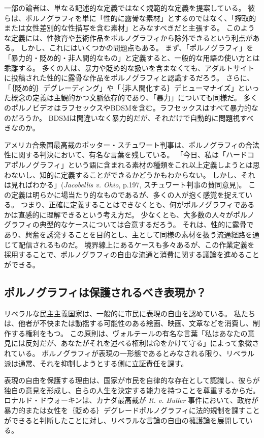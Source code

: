 \documentclass[paper=a4,book,openany]{jlreq}
\newcommand{\ig}[1]{}           %
\begin{document}
一部の論者は、単なる記述的な定義ではなく規範的な定義を提案している。
彼らは、ポルノグラフィを単に「性的に露骨な素材」とするのではなく、「搾取的または女性差別的な性描写を含む素材」とみなすべきだと主張する。
このような定義には、性教育や芸術作品をポルノグラフィから除外できるという利点がある。
しかし、これにはいくつかの問題点もある。
まず、「ポルノグラフィ」を「暴力的・貶め的・非人間的なもの」と定義すると、一般的な用語の使い方とは乖離する。
多くの人は、暴力や貶め的な扱いを含まなくても、アダルトサイトに投稿された性的に露骨な作品をポルノグラフィと認識するだろう。
さらに、「｛貶め的｝{デグレーディング}」や「｛非人間化する｝{デヒューマナイズ}」といった概念の定義は主観的かつ文脈依存的であり、「暴力」についても同様だ。
多くのポルノビデオはラフセックスやBDSMを含む。ラフセックスはすべて暴力的なのだろうか。
BDSMは間違いなく暴力的だが、それだけで自動的に問題視すべきなのか。

アメリカ合衆国最高裁のポッター・スチュワート判事は、ポルノグラフィの合法性に関する判決において、有名な言葉を残している。
「今日、私は「ハードコアポルノグラフィ」という語に含まれる素材の種類をこれ以上定義しようとは思わないし、知的に定義することができるかどうかもわからない。
しかし、それは見ればわかる」(\emph{Jacobellis v. Ohio}, p.197, スチュワート判事の賛同意見)。
この定義は明らかに場当たり的なものであるが、多くの人が抱く感覚を捉えている。
つまり、正確に定義することはできなくとも、何がポルノグラフィであるかは直感的に理解できるという考え方だ。
少なくとも、大多数の人々がポルノグラフィの典型的なケースについては合意するだろう。
それは、性的に露骨であり、興奮を誘発することを目的とし、主として同様の素材を扱う流通経路を通じて配信されるものだ。
境界線上にあるケースも多々あるが、この作業定義を採用することで、ポルノグラフィの自由な流通と消費に関する議論を進めることができる。

\subsection{ポルノグラフィは保護されるべき表現か？}

リベラルな民主主義国家は、一般的に市民に表現の自由を認めている。
私たちは、他者が不快または動揺する可能性のある絵画、映画、文章などを消費し、制作する権利をもつ。
この原則は、ヴォルテールの有名な言葉「私はあなたの意見には反対だが、あなたがそれを述べる権利は命をかけて守る」によって象徴されている。
ポルノグラフィが表現の一形態であるとみなされる限り、リベラル派は通常、それを抑制しようとする側に立証責任を課す。

表現の自由を保護する理由は、国家が市民を自律的な存在として認識し、彼らが独自の意見を形成し、自らの人生を決定する能力を持つことを尊重するからだ。
ロナルド・ドウォーキン\ig{Ronald Dworkin}は、カナダ最高裁が \emph{R. v. Butler} 事件において、政府が暴力的または女性を｛貶める｝{デグレード}ポルノグラフィに法的規制を課すことができると判断したことに対し、リベラルな言論の自由の擁護論を展開している。
\end{document}
